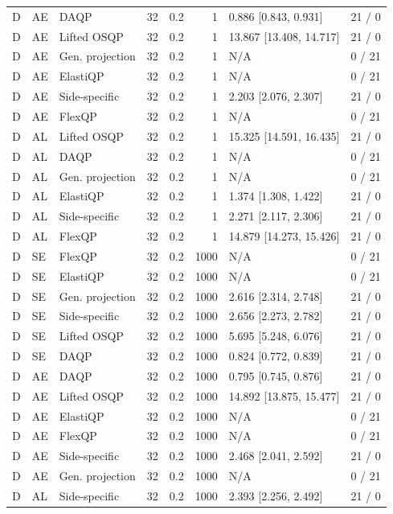 \begin{longtable}{@{}lllrrrlr@{}}
D & AE & DAQP & 32 & 0.2 & 1 & 0.886 [0.843, 0.931] & 21 / 0 \\
D & AE & Lifted OSQP & 32 & 0.2 & 1 & 13.867 [13.408, 14.717] & 21 / 0 \\
D & AE & Gen. projection & 32 & 0.2 & 1 & N/A & 0 / 21 \\
D & AE & ElastiQP & 32 & 0.2 & 1 & N/A & 0 / 21 \\
D & AE & Side-specific & 32 & 0.2 & 1 & 2.203 [2.076, 2.307] & 21 / 0 \\
D & AE & FlexQP & 32 & 0.2 & 1 & N/A & 0 / 21 \\
D & AL & Lifted OSQP & 32 & 0.2 & 1 & 15.325 [14.591, 16.435] & 21 / 0 \\
D & AL & DAQP & 32 & 0.2 & 1 & N/A & 0 / 21 \\
D & AL & Gen. projection & 32 & 0.2 & 1 & N/A & 0 / 21 \\
D & AL & ElastiQP & 32 & 0.2 & 1 & 1.374 [1.308, 1.422] & 21 / 0 \\
D & AL & Side-specific & 32 & 0.2 & 1 & 2.271 [2.117, 2.306] & 21 / 0 \\
D & AL & FlexQP & 32 & 0.2 & 1 & 14.879 [14.273, 15.426] & 21 / 0 \\
D & SE & FlexQP & 32 & 0.2 & 1000 & N/A & 0 / 21 \\
D & SE & ElastiQP & 32 & 0.2 & 1000 & N/A & 0 / 21 \\
D & SE & Gen. projection & 32 & 0.2 & 1000 & 2.616 [2.314, 2.748] & 21 / 0 \\
D & SE & Side-specific & 32 & 0.2 & 1000 & 2.656 [2.273, 2.782] & 21 / 0 \\
D & SE & Lifted OSQP & 32 & 0.2 & 1000 & 5.695 [5.248, 6.076] & 21 / 0 \\
D & SE & DAQP & 32 & 0.2 & 1000 & 0.824 [0.772, 0.839] & 21 / 0 \\
D & AE & DAQP & 32 & 0.2 & 1000 & 0.795 [0.745, 0.876] & 21 / 0 \\
D & AE & Lifted OSQP & 32 & 0.2 & 1000 & 14.892 [13.875, 15.477] & 21 / 0 \\
D & AE & ElastiQP & 32 & 0.2 & 1000 & N/A & 0 / 21 \\
D & AE & FlexQP & 32 & 0.2 & 1000 & N/A & 0 / 21 \\
D & AE & Side-specific & 32 & 0.2 & 1000 & 2.468 [2.041, 2.592] & 21 / 0 \\
D & AE & Gen. projection & 32 & 0.2 & 1000 & N/A & 0 / 21 \\
D & AL & Side-specific & 32 & 0.2 & 1000 & 2.393 [2.256, 2.492] & 21 / 0 \\

\end{longtable}
